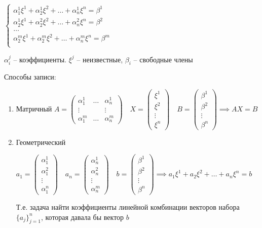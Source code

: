 \documentclass{book}
\theoremstyle{definition}
\begin{document}
\begin{definition}
    $\begin{cases}
        
    \alpha_1^1\xi^1 + \alpha^1_2\xi^2 + \ldots + \alpha^1_n\xi^n = \beta^1\\
    \alpha_2^1\xi^1 + \alpha^2_2\xi^2 + \ldots + \alpha^2_n\xi^n = \beta^2\\
    \ldots\\
    \alpha_2^m\xi^1 + \alpha^m_2\xi^2 + \ldots + \alpha^m_n\xi^n = \beta^m\\
    \end{cases}$


    $\alpha_i^j$ -- коэффициенты.  $\xi^j$ -- неизвестные,  $\beta_i$ -- свободные члены
\end{definition}
Способы записи:
\begin{enumerate}
    \item Матричный $A = \begin{pmatrix} \alpha_1^1 & \ldots & \alpha_n^1\\ \vdots & & \vdots\\ \alpha_1^m & \ldots & \alpha_n^m \end{pmatrix}\quad X = \begin{pmatrix} \xi^1\\ \xi^2 \\ \vdots \\ \xi^n \end{pmatrix} \quad B = \begin{pmatrix} \beta^1 \\ \beta^2 \\ \vdots \\ \beta^n \end{pmatrix} \implies AX = B $
    \item Геометрический

        $a_1 = \begin{pmatrix} \alpha_1^1 \\ \alpha_1^2 \\ \vdots \\ \alpha_1^n \end{pmatrix} \quad a_n = \begin{pmatrix} \alpha_n^1 \\ \alpha_n^2 \\ \vdots \\ \alpha_n^m \end{pmatrix} \quad b =\begin{pmatrix} \beta^1 \\ \beta^2 \\ \vdots \\ \beta^n \end{pmatrix} \implies a_1\xi^1 + a_2\xi^2 + \ldots + a_n\xi^n = b $

        Т.е. задача найти коэффициенты линейной комбинации векторов набора $\{a_j\}_{j=1}^n$, которая давала бы вектор  $b$
\end{enumerate}
\end{document}
